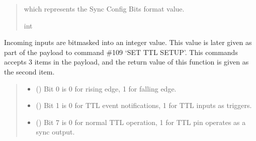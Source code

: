 \documentclass[letterpaper,10pt,english]{sphinxmanual}
\begin{document}
\begin{fulllineitems}
\begin{fulllineitems}
\begin{quote}
\begin{description}
\begin{itemize}
\end{itemize}

\sphinxAtStartPar
which represents the Sync Config Bits format value.

\sphinxAtStartPar
int

\end{description}\end{quote}

\end{fulllineitems}


\begin{fulllineitems}
\label{\detokenize{Morelia.Devices:Morelia.Devices.PodDevice_8480SC.Pod8480SC.TtlConfigBits}}
\pysigstartsignatures
{}
\pysigstopsignatures
\sphinxAtStartPar
Incoming inputs are bitmasked into an integer value. This value is later given as part of the payload to         command \#109 ‘SET TTL SETUP’. This commands accepts 3 items in the payload, and the return value of this function         is given as the second item.
\begin{quote}\begin{description}
\begin{itemize}
\item {} 
\sphinxAtStartPar
{} () \textendash{} Bit 0 is 0 for rising edge, 1 for falling edge.

\item {} 
\sphinxAtStartPar
{} () \textendash{} Bit 1 is  0 for TTL event notifications, 1 for TTL inputs as triggers.

\item {} 
\sphinxAtStartPar
{} () \textendash{} Bit 7 is 0 for normal TTL operation, 1 for TTL pin operates as a sync output.


\end{itemize}
\end{description}
\end{quote}
\end{fulllineitems}
\end{fulllineitems}
\end{document}

